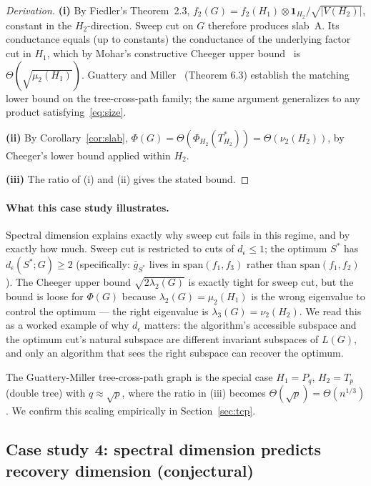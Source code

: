 \documentclass{article}
\theoremstyle{definition}
\theoremstyle{remark}
\begin{document}
\begin{proof}[Derivation]
\textbf{(i)} By Fiedler's Theorem~2.3, $f_2(G) = f_2(H_1) \otimes \mathbf{1}_{H_2}/\sqrt{|V(H_2)|}$, constant in the $H_2$-direction. Sweep cut on $G$ therefore produces slab~A. Its conductance equals (up to constants) the conductance of the underlying factor cut in $H_1$, which by Mohar's constructive Cheeger upper bound~\cite{mohar1989isoperimetric} is $\Theta(\sqrt{\mu_2(H_1)})$. Guattery and Miller~\cite{guattery1998quality} (Theorem 6.3) establish the matching lower bound on the tree-cross-path family; the same argument generalizes to any product satisfying~\eqref{eq:size}.

\textbf{(ii)} By Corollary~\ref{cor:slab}, $\Phi(G) = \Theta(\Phi_{H_2}(T^*_{H_2})) = \Theta(\nu_2(H_2))$, by Cheeger's lower bound applied within $H_2$.

\textbf{(iii)} The ratio of (i) and (ii) gives the stated bound.
\end{proof}

\paragraph{What this case study illustrates.} Spectral dimension explains exactly why sweep cut fails in this regime, and by exactly how much. Sweep cut is restricted to cuts of $d_\epsilon \leq 1$; the optimum $S^*$ has $d_\epsilon(S^*; G) \geq 2$ (specifically: $\bar g_{S^*}$ lives in $\mathrm{span}(f_1, f_3)$ rather than $\mathrm{span}(f_1, f_2)$). The Cheeger upper bound $\sqrt{2\lambda_2(G)}$ is exactly tight for sweep cut, but the bound is loose for $\Phi(G)$ because $\lambda_2(G) = \mu_2(H_1)$ is the wrong eigenvalue to control the optimum --- the right eigenvalue is $\lambda_3(G) = \nu_2(H_2)$. We read this as a worked example of why $d_\epsilon$ matters: the algorithm's accessible subspace and the optimum cut's natural subspace are different invariant subspaces of $L(G)$, and only an algorithm that sees the right subspace can recover the optimum.

The Guattery-Miller tree-cross-path graph is the special case $H_1 = P_q$, $H_2 = T_p$ (double tree) with $q \approx \sqrt{p}$, where the ratio in (iii) becomes $\Theta(\sqrt{p}) = \Theta(n^{1/3})$. We confirm this scaling empirically in Section~\ref{sec:tcp}.

\subsection{Case study 4: spectral dimension predicts recovery dimension (conjectural)}
\label{sec:case4}
\end{document}
